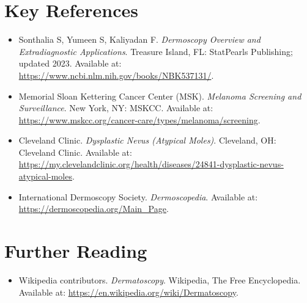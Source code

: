 \section{Key References}
\begin{itemize}
\item Sonthalia S, Yumeen S, Kaliyadan F. \textit{Dermoscopy Overview and Extradiagnostic Applications}. Treasure Island, FL: StatPearls Publishing; updated 2023. Available at: \url{https://www.ncbi.nlm.nih.gov/books/NBK537131/}.
\item Memorial Sloan Kettering Cancer Center (MSK). \textit{Melanoma Screening and Surveillance}. New York, NY: MSKCC. Available at: \url{https://www.mskcc.org/cancer-care/types/melanoma/screening}.
\item Cleveland Clinic. \textit{Dysplastic Nevus (Atypical Moles)}. Cleveland, OH: Cleveland Clinic. Available at: \url{https://my.clevelandclinic.org/health/diseases/24841-dysplastic-nevus-atypical-moles}.
\item International Dermoscopy Society. \textit{Dermoscopedia}. Available at: \url{https://dermoscopedia.org/Main_Page}.
\end{itemize}

\section{Further Reading}
\begin{itemize}
  \item Wikipedia contributors. \textit{Dermatoscopy}. Wikipedia, The Free Encyclopedia. Available at: \url{https://en.wikipedia.org/wiki/Dermatoscopy}.
\end{itemize}
